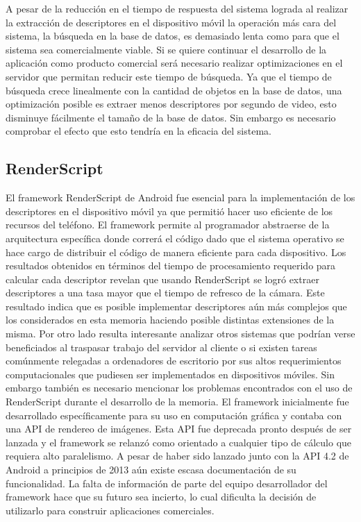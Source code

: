A pesar de la reducción en el tiempo de respuesta del sistema lograda al realizar la extracción de descriptores en el dispositivo móvil la operación más cara del sistema, la búsqueda en la base de datos, es demasiado lenta como para que el sistema sea comercialmente viable. Si se quiere continuar el desarrollo de la aplicación como producto comercial será necesario realizar optimizaciones en el servidor que permitan reducir este tiempo de búsqueda. Ya que el tiempo de búsqueda crece linealmente con la cantidad de objetos en la base de datos, una optimización posible es extraer menos descriptores por segundo de video, esto disminuye fácilmente el tamaño de la base de datos. Sin embargo es necesario comprobar el efecto que esto tendría en la eficacia del sistema.

\subsection*{RenderScript}
El framework RenderScript de Android fue esencial para la implementación de los descriptores en el dispositivo móvil ya que permitió hacer uso eficiente de los recursos del teléfono. El framework permite al programador abstraerse de la arquitectura específica donde correrá el código dado que el sistema operativo se hace cargo de distribuir el código de manera eficiente para cada dispositivo. Los resultados obtenidos en términos del tiempo de procesamiento requerido para calcular cada descriptor revelan que usando RenderScript se logró extraer descriptores a una tasa mayor que el tiempo de refresco de la cámara. Este resultado indica que es posible implementar descriptores aún más complejos que los considerados en esta memoria haciendo posible distintas extensiones de la misma. Por otro lado resulta interesante analizar otros sistemas que podrían verse beneficiados al traspasar trabajo del servidor al cliente o si existen tareas comúnmente relegadas a ordenadores de escritorio por sus altos requerimientos computacionales que pudiesen ser implementados en dispositivos móviles.
Sin embargo también es necesario mencionar los problemas encontrados con el uso de RenderScript durante el desarrollo de la memoria. El framework inicialmente fue desarrollado específicamente para su uso en computación gráfica y contaba con una API de rendereo de imágenes. Esta API fue deprecada pronto después de ser lanzada y el framework se relanzó como orientado a cualquier tipo de cálculo que requiera alto paralelismo. A pesar de haber sido lanzado junto con la API 4.2 de Android a principios de 2013 aún existe escasa documentación de su funcionalidad. La falta de información de parte del equipo desarrollador del framework hace que su futuro sea incierto, lo cual dificulta la decisión de utilizarlo para construir aplicaciones comerciales.

